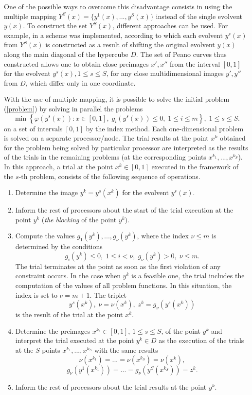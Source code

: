 \documentclass[smallextended]{svjour3}       %
\begin{document}
One of the possible ways to overcome this disadvantage consists in using the multiple mapping $Y^S(x)=\{ y^1 (x),...,y^S(x)\}$ instead of the single evolvent $y(x)$. To construct the set $Y^S(x)$, different approaches can be used. For example, in \cite{Strongin2000} a scheme was implemented, according to which each evolvent $y^s(x)$ from $Y^S(x)$ is constructed as a result of shifting the original evolvent $y(x)$ along the main diagonal of the hypercube $D$. The set of Peano curves thus constructed allows one to obtain close preimages $x', x''$ from the interval $[0,1]$ for the evolvent $y^s(x), 1\leq s \leq S$, for any close multidimensional images $y', y''$ from $D$, which differ only in one coordinate.

With the use of multiple mapping, it is possible to solve the initial problem (\ref{problem}) by solving in parallel the problems
\[
\min \left\{\varphi(y^s(x)): x \in [0,1], \; g_i(y^s(x))\leq 0, \; 1 \leq i \leq m\right\},\; 1\leq s \leq S.
\]
on a set of intervals $[0,1]$ by the index method. Each one-dimensional problem is solved on a separate processor/node. The trial results at the point $x^k$ obtained for the problem being solved by particular processor are interpreted as the results of the trials in the remaining problems (at the corresponding points $x^{k_1},...,x^{k_S}$). In this approach, a trial at the point $x^k \in [0,1]$ executed in the framework of the $s$-th problem, consists of the following sequence of operations.

\begin{enumerate}
	
	\item Determine the image $y^k=y^s(x^k)$ for the evolvent $y^s(x)$.
	
	\item Inform the rest of processors about the start of the trial execution at the point $y^k$ (\textit{the blocking} of the point $y^k$).
	
	\item Compute the values $g_1(y^k),...,g_\nu(y^k)$, where the index $\nu \leq m$ is determined by the conditions
	\[
		g_i(y^k)\leq 0, \; 1 \leq i < \nu, \; g_\nu(y^k)>0, \; \nu \leq m.
	\]
The trial terminates at the point as soon as the first violation of any constraint occurs. In the case when $y^k$ is a feasible one, the trial includes the computation of the values of all problem functions. In this situation, the index is set to $\nu=m+1$. The triplet
\[
y^s(x^k), \; \nu=\nu(x^k), \; z^k=g_\nu(y^s(x^k))
\]
is the result of the trial at the point $x^k$.

\item Determine the preimages $x^{k_s} \in [0,1]$, $1 \leq s \leq S$, of the point $y^k$ and interpret the trial executed at the point $y^k \in D$ as the execution of the trials at the $S$ points  $x^{k_1},...,x^{k_S}$ with the same results
\[
 \nu(x^{k_1}) = ... = \nu(x^{k_S}) = \nu(x^k),
\]
\[
 g_\nu(y^1(x^{k_1})) = ... = g_\nu(y^S(x^{k_S})) = z^k.
\]

\item Inform the rest of processors about the trial results at the point $y^k$.
	
\end{enumerate}
\end{document}
